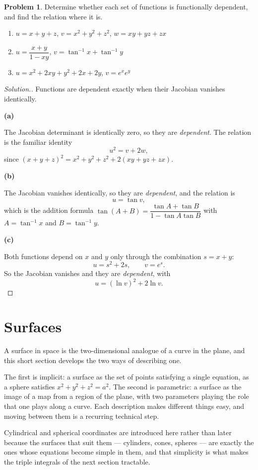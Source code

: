 \documentclass[11pt,a4paper]{article}
\theoremstyle{definition}
\newtheorem{problemx}{Problem}[subsection]
\newenvironment{problem}{\begin{problemx}}{\end{problemx}}
\newenvironment{solution}
  {\renewcommand{\qedsymbol}{}\begin{proof}[\textit{Solution}.]}
  {\end{proof}}
\newcommand{\subhead}[1]{%
  \par\medskip\noindent\textbf{#1}\par\nobreak\smallskip}
\begin{document}
\begin{problem}
Determine whether each set of functions is functionally dependent, and find the
relation where it is.
\begin{enumerate}
\item[(a)] $u = x+y+z$, $v = x^2+y^2+z^2$, $w = xy+yz+zx$
\item[(b)] $u = \dfrac{x+y}{1-xy}$, $v = \tan^{-1}x + \tan^{-1}y$
\item[(c)] $u = x^2+2xy+y^2+2x+2y$, $v = e^xe^y$
\end{enumerate}
\end{problem}
\begin{solution}
Functions are dependent exactly when their Jacobian vanishes identically.

\subhead{(a)}
The Jacobian determinant is identically zero, so they are \emph{dependent}. The
relation is the familiar identity
\[u^2 = v + 2w ,\]
since $(x+y+z)^2 = x^2+y^2+z^2 + 2(xy+yz+zx)$.

\subhead{(b)}
The Jacobian vanishes identically, so they are \emph{dependent}, and the
relation is
\[u = \tan v ,\]
which is the addition formula
$\tan(A+B) = \dfrac{\tan A+\tan B}{1-\tan A\tan B}$ with
$A = \tan^{-1}x$ and $B = \tan^{-1}y$.

\subhead{(c)}
Both functions depend on $x$ and $y$ only through the combination $s = x+y$:
\[u = s^2+2s,\qquad v = e^{s}.\]
So the Jacobian vanishes and they are \emph{dependent}, with
\[u = (\ln v)^2 + 2\ln v .\]
\end{solution}


{\color[wave]{485}\section{Surfaces}}

A surface in space is the two-dimensional analogue of a curve in the plane, and
this short section develops the two ways of describing one.

The first is implicit: a surface as the set of points satisfying a single
equation, as a sphere satisfies $x^2+y^2+z^2 = a^2$. The second is parametric:
a surface as the image of a map from a region of the plane, with two parameters
playing the role that one plays along a curve. Each description makes different
things easy, and moving between them is a recurring technical step.

Cylindrical and spherical coordinates are introduced here rather than later
because the surfaces that suit them --- cylinders, cones, spheres --- are exactly
the ones whose equations become simple in them, and that simplicity is what makes
the triple integrals of the next section tractable.
\end{document}
